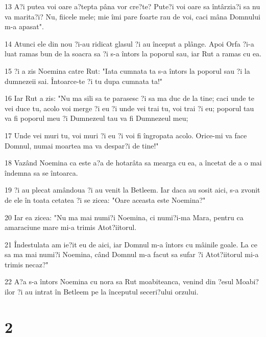 \par 13 A?i putea voi oare a?tepta pâna vor cre?te? Pute?i voi oare sa întârzia?i sa nu va marita?i? Nu, fiicele mele; mie îmi pare foarte rau de voi, caci mâna Domnului m-a apasat".
\par 14 Atunci ele din nou ?i-au ridicat glasul ?i au început a plânge. Apoi Orfa ?i-a luat ramas bun de la soacra sa ?i s-a întors la poporul sau, iar Rut a ramas cu ea.
\par 15 ?i a zis Noemina catre Rut: "Iata cumnata ta s-a întors la poporul sau ?i la dumnezeii sai. Întoarce-te ?i tu dupa cumnata ta!"
\par 16 Iar Rut a zis: "Nu ma sili sa te parasesc ?i sa ma duc de la tine; caci unde te vei duce tu, acolo voi merge ?i eu ?i unde vei trai tu, voi trai ?i eu; poporul tau va fi poporul meu ?i Dumnezeul tau va fi Dumnezeul meu;
\par 17 Unde vei muri tu, voi muri ?i eu ?i voi fi îngropata acolo. Orice-mi va face Domnul, numai moartea ma va despar?i de tine!"
\par 18 Vazând Noemina ca este a?a de hotarâta sa mearga cu ea, a încetat de a o mai îndemna sa se întoarca.
\par 19 ?i au plecat amândoua ?i au venit la Betleem. Iar daca au sosit aici, s-a zvonit de ele în toata cetatea ?i se zicea: "Oare aceasta este Noemina?"
\par 20 Iar ea zicea: "Nu ma mai numi?i Noemina, ci numi?i-ma Mara, pentru ca amaraciune mare mi-a trimis Atot?iitorul.
\par 21 Îndestulata am ie?it eu de aici, iar Domnul m-a întors cu mâinile goale. La ce sa ma mai numi?i Noemina, când Domnul m-a facut sa sufar ?i Atot?iitorul mi-a trimis necaz?"
\par 22 A?a s-a întors Noemina cu nora sa Rut moabiteanca, venind din ?esul Moabi?ilor ?i au intrat în Betleem pe la începutul seceri?ului orzului.

\chapter{2}

